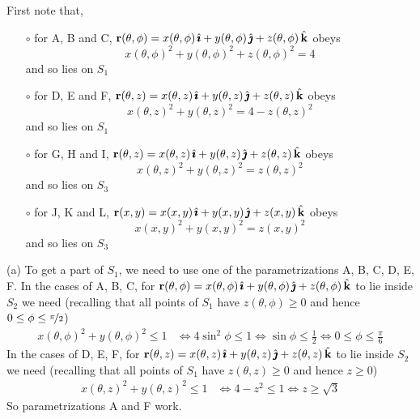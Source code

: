 \begin{solution} 
First note that,
\begin{itemize}\itemsep1pt \parskip0pt  %
\item[$\circ$] 
for A, B and C, $\mathbf{r}(\theta, \phi)
=x(\theta, \phi)\,\hat{\pmb{\imath}}+ y(\theta, \phi)\,\hat{\pmb{\jmath}}+z(\theta, \phi)\,\hat{\mathbf{k}}$
obeys
\begin{equation*}
x(\theta, \phi)^2+ y(\theta, \phi)^2+z(\theta, \phi)^2 = 4
\end{equation*}
and so lies on $S_1$
\item[$\circ$] 
for D, E and F, $\mathbf{r}(\theta, z)
=x(\theta, z)\,\hat{\pmb{\imath}}+ y(\theta, z)\,\hat{\pmb{\jmath}}+z(\theta, z)\,\hat{\mathbf{k}}$
obeys
\begin{equation*}
x(\theta, z)^2+ y(\theta, z)^2=4-z(\theta, z)^2 
\end{equation*}
and so lies on $S_1$
\item[$\circ$] 
for G, H and I, $\mathbf{r}(\theta, z)
=x(\theta, z)\,\hat{\pmb{\imath}}+ y(\theta, z)\,\hat{\pmb{\jmath}}+z(\theta, z)\,\hat{\mathbf{k}}$
obeys
\begin{equation*}
x(\theta, z)^2+ y(\theta, z)^2=z(\theta, z)^2 
\end{equation*}
and so lies on $S_3$
\item[$\circ$] 
for J, K and L, $\mathbf{r}(x, y)
=x(x, y)\,\hat{\pmb{\imath}}+ y(x, y)\,\hat{\pmb{\jmath}}+z(x, y)\,\hat{\mathbf{k}}$
obeys
\begin{equation*}
x(x, y)^2+ y(x, y)^2=z(x, y)^2 
\end{equation*}
and so lies on $S_3$
\end{itemize}


(a) To get a part of $S_1$, we need to use one of the parametrizations
A, B, C, D, E, F. 
In the cases of A, B, C,  for $\mathbf{r}(\theta, \phi)
=x(\theta, \phi)\,\hat{\pmb{\imath}}+ y(\theta, \phi)\,\hat{\pmb{\jmath}}+z(\theta, \phi)\,\hat{\mathbf{k}}$
to lie inside $S_2$ we need (recalling that all points of $S_1$ have $z(\theta,\phi)\ge 0$ and hence $0\le\phi\le\nicefrac{\pi}{2}$)
\begin{align*}
x(\theta, \phi)^2 + y(\theta, \phi)^2 \le 1
&\iff 4\sin^2\phi \le 1
\iff \sin\phi \le \frac{1}{2}
\iff 0\le\phi\le \frac{\pi}{6} 
\end{align*}
In the cases of D, E, F,  for $\mathbf{r}(\theta, z)
=x(\theta, z)\,\hat{\pmb{\imath}}+ y(\theta, z)\,\hat{\pmb{\jmath}}+z(\theta, z)\,\hat{\mathbf{k}}$
to lie inside $S_2$ we need (recalling that all points of $S_1$ have $z(\theta,z)\ge 0$ and hence $z\ge 0$)
\begin{align*}
x(\theta, z)^2 + y(\theta, z)^2 \le 1
&\iff 4-z^2 \le 1
\iff z \ge \sqrt{3}
\end{align*}
So parametrizations A and F work.


\end{solution}
